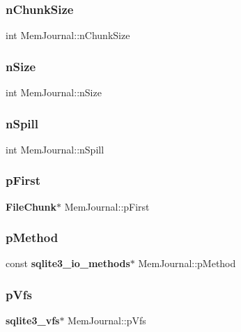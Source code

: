 \mbox{\label{struct_mem_journal_a15ba0375c0a30b355f5f7594e8804c1a}} 
\subsubsection{nChunkSize}
{\footnotesize\ttfamily int Mem\+Journal\+::n\+Chunk\+Size}

\mbox{\label{struct_mem_journal_a5c3de9e25d0e0a6fb36beec447de0c36}} 
\subsubsection{nSize}
{\footnotesize\ttfamily int Mem\+Journal\+::n\+Size}

\mbox{\label{struct_mem_journal_afee076918f23dc1cd05681cb0504a77d}} 
\subsubsection{nSpill}
{\footnotesize\ttfamily int Mem\+Journal\+::n\+Spill}

\mbox{\label{struct_mem_journal_ade7a6dea7b38a8a86f33476ae207765f}} 
\subsubsection{pFirst}
{\footnotesize\ttfamily \textbf{ File\+Chunk}$\ast$ Mem\+Journal\+::p\+First}

\mbox{\label{struct_mem_journal_aad04f16d7faaeb548b3197cce7b0d37f}} 
\subsubsection{pMethod}
{\footnotesize\ttfamily const \textbf{ sqlite3\+\_\+io\+\_\+methods}$\ast$ Mem\+Journal\+::p\+Method}

\mbox{\label{struct_mem_journal_a5174aefb3d641db787fd1952e6e2fd7d}} 
\subsubsection{pVfs}
{\footnotesize\ttfamily \textbf{ sqlite3\+\_\+vfs}$\ast$ Mem\+Journal\+::p\+Vfs}

